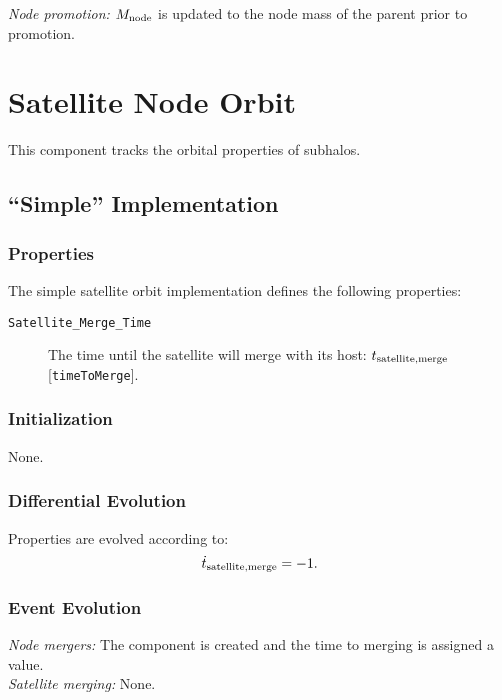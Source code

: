 \noindent\emph{Node promotion:} $M_{\rm node}$ is updated to the node mass of the parent prior to promotion.\\

\section{Satellite Node Orbit}

This component tracks the orbital properties of subhalos.

\subsection{``Simple'' Implementation}

\subsubsection{Properties}

The simple satellite orbit implementation defines the following properties:
\begin{description}
 \item [{\tt Satellite\_Merge\_Time}] The time until the satellite will merge with its host: $t_{\rm satellite, merge}$ [{\tt timeToMerge}].
\end{description}

\subsubsection{Initialization}

None.

\subsubsection{Differential Evolution}

Properties are evolved according to:
\begin{equation}
 \dot{t}_{\rm satellite, merge} = -1.
\end{equation}

\subsubsection{Event Evolution}

\noindent\emph{Node mergers:} The component is created and the time to merging is assigned a value.\\

\noindent\emph{Satellite merging:} None.\\

